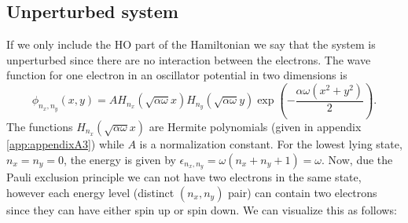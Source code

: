 \documentclass[english, a4paper]{article}
\begin{document}
\subsection{Unperturbed system}
If we only include the HO part of the Hamiltonian we say that the system is unperturbed since 
there are no interaction between the electrons. The wave function for one 
electron in an oscillator potential in two dimensions is
\begin{equation}
 \phi_{n_x,n_y}(x,y) = AH_{n_x}(\sqrt{\alpha\omega}x)H_{n_y}
 (\sqrt{\alpha\omega}y)\exp\left(-\frac{\alpha\omega(x^2+y^2)}{2}\right).
 \label{singleParticleWF}
\end{equation}
The functions $H_{n_x}(\sqrt{\alpha\omega}x)$ are Hermite polynomials (given in appendix \ref{app:appendixA3})
while $A$ is a normalization constant. 
For the lowest lying state, $n_x = n_y = 0$, the energy is given by
$\epsilon_{n_x,n_y} = \omega(n_x+n_y+1) = \omega$. Now, due the Pauli exclusion principle we can not 
have two electrons in the same state, however each energy level (distinct $(n_x,n_y)$ pair)
can contain two electrons since they can have either spin up or spin down. We can visualize this as follows:
\end{document}

